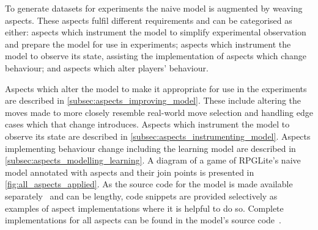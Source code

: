 




To generate datasets for experiments the naive model is augmented by weaving
aspects. These aspects fulfil different requirements and can be categorised as
either: aspects which instrument the model to simplify experimental observation
and prepare the model for use in experiments; aspects which instrument the model
to observe its state, assisting the implementation of aspects which change
behaviour; and aspects which alter players' behaviour.

Aspects which alter the model to make it appropriate for use in the experiments
are described in \cref{subsec:aspects_improving_model}. These include altering
the moves made to more closely resemble real-world move selection and handling
edge cases which that change introduces. Aspects which instrument the model to
observe its state are described in \cref{subsec:aspects_instrumenting_model}.
Aspects implementing behaviour change including the learning model are described
in \cref{subsec:aspects_modelling_learning}. A diagram of a game of RPGLite's
naive model annotated with aspects and their join points is presented in
\cref{fig:all_aspects_applied}. As the source code for the model is made
available separately~\cite{rpglite_analysis_and_experiments_repo} and can be
lengthy, code snippets are provided selectively as examples of aspect
implementations where it is helpful to do so. Complete implementations for all
aspects can be found in the model's source
code~\cite{rpglite_analysis_and_experiments_repo}.

